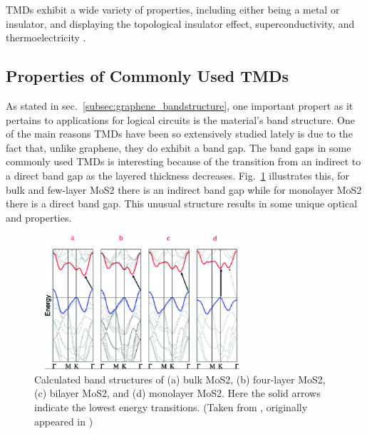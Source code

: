 \noindent \acp{TMD} exhibit a wide variety of properties, including either being a metal or insulator, and displaying the topological insulator effect, superconductivity, and thermoelectricity \cite{Lang_ACSnano2012,Zhang_AdvMat2012,Xie_AppPhysLett2009,Gamble_JournChemPhys1975}.

\subsection{Properties of Commonly Used \acp{TMD}}\label{subsec:tmd_properties}
\noindent As stated in sec.~\ref{subsec:graphene_bandstructure}, one important propert as it pertains to applications for logical circuits is the material's band structure. One of the main reasons \acp{TMD} have been so extensively studied lately is due to the fact that, unlike graphene, they do exhibit a band gap. The band gaps in some commonly used \acp{TMD} is interesting because of the transition from an indirect to a direct band gap as the layered thickness decreases. Fig.~\ref{fig:mos2_bandstructure} illustrates this, for bulk and few-layer \acs{MoS2} there is an indirect band gap while for monolayer \acs{MoS2} there is a direct band gap. This unusual structure results in some unique optical and properties.
\begin{figure}[ht]
	\centering
	\includegraphics[height=5cm,width=8cm]{figs/intro/mos2_bandstructure}
	\caption[Band structures of \acs{MoS2}]{Calculated band structures of (a) bulk \acs{MoS2}, (b) four-layer \acs{MoS2}, (c) bilayer \acs{MoS2}, and (d) monolayer \acs{MoS2}. Here the solid arrows indicate the lowest energy transitions. (Taken from \cite{Lee_Nanoscale2014}, originally appeared in \cite{Splendiani_Nanolett2010})}
	\label{fig:mos2_bandstructure}
\end{figure}
 
